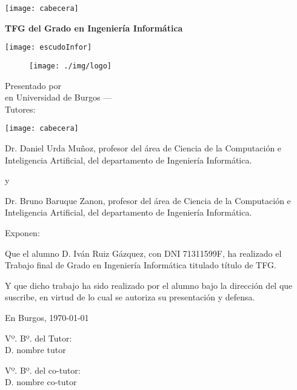 \documentclass[a4paper,12pt,twoside]{memoir}
\title{\titulo}
\author{\nombre}
\date{\today}
\makeatletter
\def\maketitle{
  \thispagestyle{empty}
  \noindent\texttt{[image: cabecera]}\vspace{1cm}%


  \colorbox{cpardoBox}{%
    \begin{minipage}{.8\textwidth}
      \vspace{.5cm}\Large
      \begin{center}
      \textbf{TFG del Grado en Ingeniería Informática}\vspace{.6cm}\\
      \textbf{\LARGE\@title{}}
      \end{center}
      \vspace{.2cm}
    \end{minipage}

  }%
  \hfill\begin{minipage}{.20\textwidth}
    \texttt{[image: escudoInfor]}
  \end{minipage}

  \begin{figure}[h!]
    \centering
    \texttt{[image: ./img/logo]}
  \end{figure}
  
  \begin{center}%
  {%
    \noindent\LARGE
    Presentado por \@author{}\\ 
    en Universidad de Burgos --- \@date{}\\
    Tutores: \@tutor{}\\
  }%
  \end{center}%
  \null
  \cleardoublepage
  }
\newcommand{\nombre}{Iván Ruiz Gázquez}
\newcommand{\dni}{71311599F}
\makeatother
\begin{document}
\maketitle

\cleardoublepage

\thispagestyle{empty}


\noindent\texttt{[image: cabecera]}\vspace{1cm}

\noindent Dr. Daniel Urda Muñoz, profesor del área de Ciencia de la Computación e Inteligencia Artificial, del departamento de Ingeniería Informática.

y

\noindent Dr. Bruno Baruque Zanon, profesor del área de Ciencia de la Computación e Inteligencia Artificial, del departamento de Ingeniería Informática.

\noindent Exponen:

\noindent Que el alumno D. \nombre, con DNI \dni, ha realizado el Trabajo final de Grado en Ingeniería Informática titulado título de TFG.

\noindent Y que dicho trabajo ha sido realizado por el alumno bajo la dirección del que suscribe, en virtud de lo cual se autoriza su presentación y defensa.

\begin{center} %
  En Burgos, {\large \today}
\end{center}

\vfill\vfill\vfill

\begin{minipage}{0.45\textwidth}
  \begin{flushleft} %
    Vº. Bº. del Tutor:\\[2cm]
    D. nombre tutor
  \end{flushleft}
\end{minipage}
\hfill
\begin{minipage}{0.45\textwidth}
  \begin{flushleft} %
    Vº. Bº. del co-tutor:\\[2cm]
    D. nombre co-tutor
  \end{flushleft}
\end{minipage}
\hfill

\vfill

\end{document}
